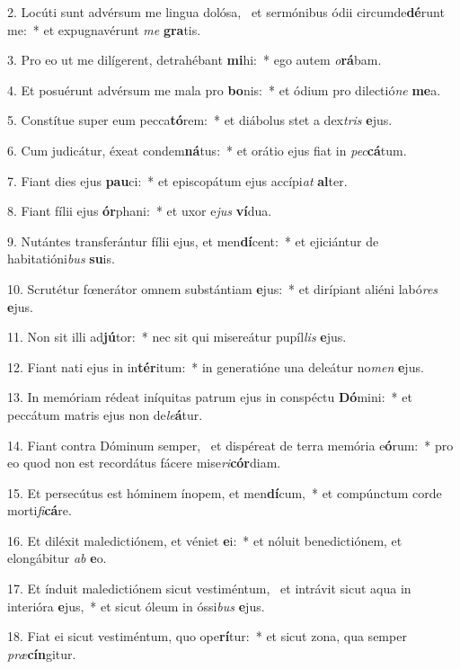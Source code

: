 2. Locúti sunt advérsum me lingua dolósa, \dag\  et sermónibus ódii circumde\textbf{dé}runt me:~*  et expugnavérunt \textit{me} \textbf{gra}tis.\

3. Pro eo ut me dilígerent, detrahébant \textbf{mi}hi:~*  ego autem \textit{o}\textbf{rá}bam.\

4. Et posuérunt advérsum me mala pro \textbf{bo}nis:~*  et ódium pro dilectió\textit{ne} \textbf{me}a.\

5. Constítue super eum pecca\textbf{tó}rem:~*  et diábolus stet a dex\textit{tris} \textbf{e}jus.\

6. Cum judicátur, éxeat condem\textbf{ná}tus:~*  et orátio ejus fiat in \textit{pec}\textbf{cá}tum.\

7. Fiant dies ejus \textbf{pau}ci:~*  et episcopátum ejus accípi\textit{at} \textbf{al}ter.\

8. Fiant fílii ejus \textbf{ór}phani:~*  et uxor e\textit{jus} \textbf{ví}dua.\

9. Nutántes transferántur fílii ejus, et men\textbf{dí}cent:~*  et ejiciántur de habitatióni\textit{bus} \textbf{su}is.\

10. Scrutétur fœnerátor omnem substántiam \textbf{e}jus:~*  et dirípiant aliéni labó\textit{res} \textbf{e}jus.\

11. Non sit illi ad\textbf{jú}tor:~*  nec sit qui misereátur pupíl\textit{lis} \textbf{e}jus.\

12. Fiant nati ejus in in\textbf{tér}itum:~*  in generatióne una deleátur no\textit{men} \textbf{e}jus.\

13. In memóriam rédeat iníquitas patrum ejus in conspéctu \textbf{Dó}mini:~*  et peccátum matris ejus non de\textit{le}\textbf{á}tur.\

14. Fiant contra Dóminum semper, \dag\  et dispéreat de terra memória e\textbf{ó}rum:~*  pro eo quod non est recordátus fácere mise\textit{ri}\textbf{cór}diam.\

15. Et persecútus est hóminem ínopem, et men\textbf{dí}cum,~*  et compúnctum corde morti\textit{fi}\textbf{cá}re.\

16. Et diléxit maledictiónem, et véniet \textbf{e}i:~*  et nóluit benedictiónem, et elongábitur \textit{ab} \textbf{e}o.\

17. Et índuit maledictiónem sicut vestiméntum, \dag\  et intrávit sicut aqua in interióra \textbf{e}jus,~*  et sicut óleum in óssi\textit{bus} \textbf{e}jus.\

18. Fiat ei sicut vestiméntum, quo ope\textbf{rí}tur:~*  et sicut zona, qua semper \textit{præ}\textbf{cín}gitur.\

